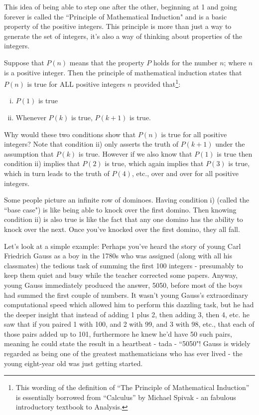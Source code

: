 \documentclass{article}
\begin{document}
This idea of being able to step one after the other,
beginning at 1 and going forever is called the ``Principle of Mathematical
Induction" and is a basic property of the positive integers.
This principle is more than just a way to generate the set of integers,
it's also a way of thinking about properties of the integers.

Suppose
that $P(n)$ means that the property $P$ holds
for the number $n$; where $n$ is a positive integer.
Then the principle of mathematical induction states that $P(n)$
is true for ALL positive integers $n$ provided that\footnote{This wording of the
definition of ``The Principle of Mathematical Induction'' is essentially borrowed
from ``Calculus'' by Michael Spivak - an fabulous introductory textbook to Analysis.}:

\begin{enumerate}[i)]
\item $P(1)$ is true
\item Whenever $P(k)$ is true, $P(k+1)$ is true.
\end{enumerate}

Why would these two conditions show that $P(n)$ is true for all
positive integers? Note that condition ii) only asserts the truth
of $P(k+1)$ under the assumption that $P(k)$ is true.
However if we also know that $P(1)$ is true then condition ii) implies that $P(2)$ is true,
which again implies that $P(3)$ is true,
which in turn leads to the truth of $P(4)$,
etc., over and over for all positive integers.

Some people picture an infinite row of dominoes.
Having condition i) (called the ``base case") is like being
able to knock over the first domino.
Then knowing condition ii) is also true is like the
fact that any one domino has the ability to knock over the next.
Once you've knocked over the first domino,
they all fall.

Let's look at a simple example:
Perhaps you've heard the story of young Carl Friedrich Gauss
as a boy in
the 1780s who was assigned (along with all his classmates)
the tedious task of summing the first 100 integers -
presumably to keep them quiet and busy while the
teacher corrected some papers. Anyway,
young Gauss immediately produced the answer,
5050, before most of the boys had summed the first couple of numbers.
It wasn't young Gauss's extraordinary computational speed which allowed
him to perform this dazzling task,
but he had the deeper insight that instead of adding 1 plus 2,
then adding 3, then 4, etc.
he saw that if you paired 1 with 100,
and 2 with 99,
and 3 with 98,
etc.,
that each of those pairs added up to 101,
furthermore he knew he'd have 50 such pairs,
meaning he could state the result in a heartbeat - tada - ``5050"!
Gauss is widely regarded as being one of the greatest
mathematicians who has ever lived - the young eight-year old was just getting started.
\end{document}
